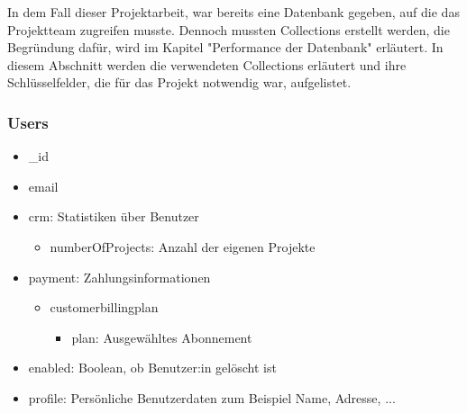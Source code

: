 In dem Fall dieser Projektarbeit, war bereits eine Datenbank gegeben, auf die das Projektteam zugreifen musste. Dennoch mussten Collections erstellt werden, die Begründung dafür, wird im Kapitel "Performance der Datenbank" erläutert. In diesem Abschnitt werden die verwendeten Collections erläutert und ihre Schlüsselfelder, die für das Projekt notwendig war, aufgelistet.

\subsubsection{Users}
\begin{itemize}
    \item \_id
    \item email
    \item crm: Statistiken über Benutzer
        \begin{itemize}
            \item numberOfProjects: Anzahl der eigenen Projekte
        \end{itemize}
    \item payment: Zahlungsinformationen
        \begin{itemize}
            \item customerbillingplan
            \begin{itemize}
                \item plan: Ausgewähltes Abonnement
            \end{itemize}
        \end{itemize}
    \item enabled: Boolean, ob Benutzer:in gelöscht ist
    \item profile: Persönliche Benutzerdaten zum Beispiel Name, Adresse, ...
\end{itemize}

